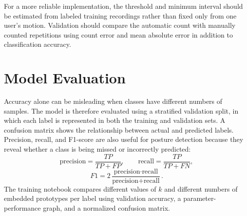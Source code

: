 For a more reliable implementation, the threshold and minimum interval should be
estimated from labeled training recordings rather than fixed only from one user's
motion. Validation should compare the automatic count with manually counted
repetitions using count error and mean absolute error in addition to classification
accuracy.

\section{Model Evaluation}
Accuracy alone can be misleading when classes have different numbers of samples.
The model is therefore evaluated using a stratified validation split, in which each
label is represented in both the training and validation sets. A confusion matrix
shows the relationship between actual and predicted labels. Precision, recall, and
F1-score are also useful for posture detection because they reveal whether a class
is being missed or incorrectly predicted:
\begin{equation}
\text{precision} = \frac{TP}{TP+FP}, \qquad
\text{recall} = \frac{TP}{TP+FN},
\end{equation}
\begin{equation}
F1 = 2\frac{\text{precision}\cdot\text{recall}}
{\text{precision}+\text{recall}}.
\end{equation}
The training notebook compares different values of $k$ and different numbers of
embedded prototypes per label using validation accuracy, a parameter-performance
graph, and a normalized confusion matrix.



